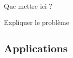 \TODO Que mettre ici ?

\TODO Expliquer le problème

\subsection{Applications} %
\label{sub:applications}

